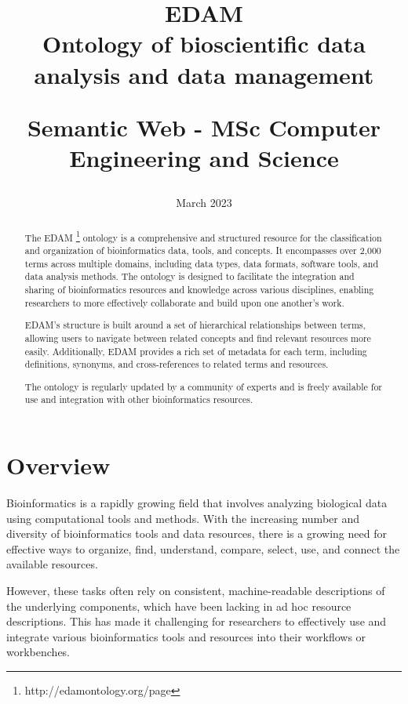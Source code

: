 \documentclass{scrartcl}
\title{EDAM
\\
Ontology of bioscientific data analysis and data management
\\
\begin{small} 
  Semantic Web - 
  MSc Computer Engineering and Science
\end{small}
}
\author{
    \emailaddr{davide.domini@studio.unibo.it}
}
\date{March 2023}
\begin{document}
\maketitle

\begin{abstract}
  The EDAM \footnote{http://edamontology.org/page} ontology is a comprehensive and structured resource for the classification and organization of bioinformatics data, 
    tools, and concepts. It encompasses over 2,000 terms across multiple domains, including data types, data formats, software tools, 
    and data analysis methods. The ontology is designed to facilitate the integration and sharing of bioinformatics resources and knowledge 
    across various disciplines, enabling researchers to more effectively collaborate and build upon one another's work.

  EDAM's structure is built around a set of hierarchical relationships between terms, allowing users to navigate between related concepts 
    and find relevant resources more easily. Additionally, EDAM provides a rich set of metadata for each term, including definitions, synonyms,
    and cross-references to related terms and resources.
  
  The ontology is regularly updated by a community of experts and is freely available for use and integration with other bioinformatics 
    resources. 
\end{abstract}


\newpage
\tableofcontents

\newpage
\listoffigures

\newpage

\section{Overview}

Bioinformatics is a rapidly growing field that involves analyzing biological data using computational 
  tools and methods. With the increasing number and diversity of bioinformatics tools and data resources, 
  there is a growing need for effective ways to organize, find, understand, compare, select, use, and connect 
  the available resources.

However, these tasks often rely on consistent, machine-readable descriptions of the underlying components, 
  which have been lacking in ad hoc resource descriptions. This has made it challenging for researchers to
  effectively use and integrate various bioinformatics tools and resources into their workflows or workbenches.
\end{document}
